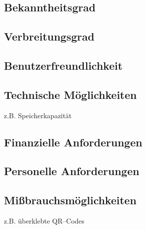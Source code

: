 \subsection{Bekanntheitsgrad}
\subsection{Verbreitungsgrad}
\subsection{Benutzerfreundlichkeit}
\subsection{Technische Möglichkeiten}
z.B. Speicherkapazität

\subsection{Finanzielle Anforderungen}
\subsection{Personelle Anforderungen}
\subsection{Mißbrauchsmöglichkeiten}
z.B. überklebte QR--Codes